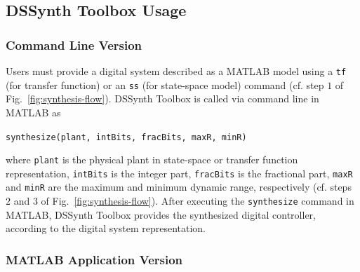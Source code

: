 \documentclass[10pt,conference]{IEEEtran}
\newcommand\tool{{DSSynth Toolbox}\xspace}
\begin{document}
\subsection{\tool Usage}

\subsubsection{Command Line Version}

Users must provide a digital system described as a MATLAB model 
using a \texttt{tf} (for transfer function) or an \texttt{ss} (for state-space model) 
command (cf. step $1$ of Fig.~\ref{fig:synthesis-flow}).
\tool is called via command line in MATLAB as 

\begin{center} 
\texttt{synthesize(plant, intBits, fracBits, maxR, minR)}
\end{center} 

\noindent where \texttt{plant} is the physical plant in state-space or transfer function representation, 
\texttt{intBits} is the integer part, \texttt{fracBits} is the fractional part, \texttt{maxR} and \texttt{minR} 
are the maximum and minimum dynamic range, respectively (cf. steps $2$ and $3$ of Fig.~\ref{fig:synthesis-flow}).
%
After executing the \texttt{synthesize} command in MATLAB, 
\tool provides the synthesized digital controller, according to the digital system representation. 

\subsubsection{MATLAB Application Version} 
\end{document}
